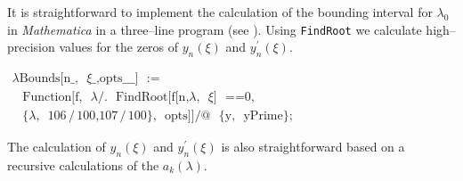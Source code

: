 \documentclass{article}
\begin{document}
It is straightforward to implement the calculation of the bounding
interval for $\lambda _{0}$ in {\itshape Mathematica} in a three--line
program (see \cite{Trott00}). Using \texttt{FindRoot} we calculate
high--precision values for the zeros of $y_{n}( \xi ) $ and $y_{n}^{\prime
}( \xi ) $.


{\ttfamily
$\begin{array}{l}
\text{$\lambda$Bounds}\text{[}\text{n\_}\text{,}\text{ }\text{$\xi$\_}\text{,}\text{
}\text{opts\_\_\_}\text{]}\text{ }\text{:=}\text{ }\\
\text{\ \ \ }\,\text{Function}\text{[}\text{f}\text{,}\text{ }\text{$\lambda$}\text{
}\text{/.}\text{ }\text{FindRoot}\text{[}\text{f}\text{[}\text{n}\text{,}\text{
}\text{$\lambda$}\text{,}\text{ }\text{$\xi$}\text{]}\text{ }\text{==}\text{
}\text{0}\text{,}\text{ }\\
\text{\ \ \ \ \ \ \ }\,\text{\{}\text{$\lambda$}\text{,}\text{ }\text{106}\,\text{/}\,\text{100}\text{,}\text{
}\text{107}\,\text{/}\,\text{100}\text{\}}\text{,}\text{ }\text{opts}\text{]}\text{]}\text{
}\text{/@}\text{ }\text{\{}\text{y}\text{,}\text{ }\text{yPrime}\text{\}}\text{;}\text{
}\end{array}$}



The calculation of $y_{n}( \xi ) $ and $y_{n}^{\prime }( \xi ) $
is also straightforward based on a recursive calculations of the
$a_{k}( \lambda ) $. 
\end{document}
